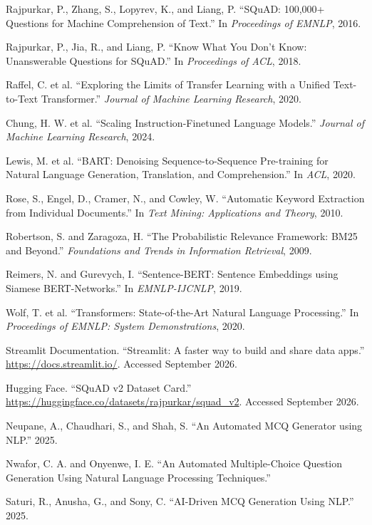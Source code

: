\documentclass[12pt,a4paper]{report}
\begin{document}
\begin{enumerate}[label={[\arabic*]}]
\item Rajpurkar, P., Zhang, S., Lopyrev, K., and Liang, P. ``SQuAD: 100,000+ Questions for Machine Comprehension of Text.'' In \textit{Proceedings of EMNLP}, 2016.
\item Rajpurkar, P., Jia, R., and Liang, P. ``Know What You Don't Know: Unanswerable Questions for SQuAD.'' In \textit{Proceedings of ACL}, 2018.
\item Raffel, C. et al. ``Exploring the Limits of Transfer Learning with a Unified Text-to-Text Transformer.'' \textit{Journal of Machine Learning Research}, 2020.
\item Chung, H. W. et al. ``Scaling Instruction-Finetuned Language Models.'' \textit{Journal of Machine Learning Research}, 2024.
\item Lewis, M. et al. ``BART: Denoising Sequence-to-Sequence Pre-training for Natural Language Generation, Translation, and Comprehension.'' In \textit{ACL}, 2020.
\item Rose, S., Engel, D., Cramer, N., and Cowley, W. ``Automatic Keyword Extraction from Individual Documents.'' In \textit{Text Mining: Applications and Theory}, 2010.
\item Robertson, S. and Zaragoza, H. ``The Probabilistic Relevance Framework: BM25 and Beyond.'' \textit{Foundations and Trends in Information Retrieval}, 2009.
\item Reimers, N. and Gurevych, I. ``Sentence-BERT: Sentence Embeddings using Siamese BERT-Networks.'' In \textit{EMNLP-IJCNLP}, 2019.
\item Wolf, T. et al. ``Transformers: State-of-the-Art Natural Language Processing.'' In \textit{Proceedings of EMNLP: System Demonstrations}, 2020.
\item Streamlit Documentation. ``Streamlit: A faster way to build and share data apps.'' \url{https://docs.streamlit.io/}. Accessed September 2026.
\item Hugging Face. ``SQuAD v2 Dataset Card.'' \url{https://huggingface.co/datasets/rajpurkar/squad_v2}. Accessed September 2026.
\item Neupane, A., Chaudhari, S., and Shah, S. ``An Automated MCQ Generator using NLP.'' 2025.
\item Nwafor, C. A. and Onyenwe, I. E. ``An Automated Multiple-Choice Question Generation Using Natural Language Processing Techniques.''
\item Saturi, R., Anusha, G., and Sony, C. ``AI-Driven MCQ Generation Using NLP.'' 2025.
\end{enumerate}
\end{document}
